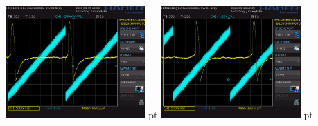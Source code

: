 \documentclass[12pt]{article}
\begin{document}
\begin{minipage}[h!]{\textwidth}
	\includegraphics[width=0.4\textwidth]{data/HHH10.PNG} pt
	\includegraphics[width=0.4\textwidth]{data/HHH11.PNG} pt
\end{minipage}
\end{document}
